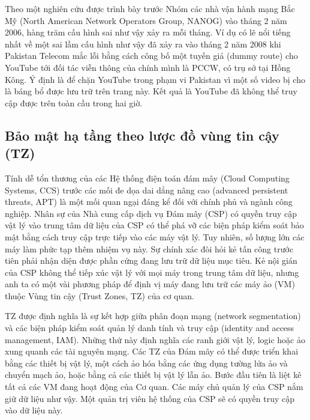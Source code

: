 Theo một nghiên cứu được trình bày trước Nhóm các nhà vận hành mạng Bắc Mỹ (North American Network Operators Group, NANOG) vào tháng 2 năm 2006, hàng trăm cấu hình sai như vậy xảy ra mỗi tháng. Ví dụ có lẽ nổi tiếng nhất về một sai lầm cấu hình như vậy đã xảy ra vào tháng 2 năm 2008 khi Pakistan Telecom mắc lỗi bằng cách công bố một tuyến giả (dummy route) cho YouTube tới đối tác viễn thông của chính mình là PCCW, có trụ sở tại Hồng Kông. Ý định là để chặn YouTube trong phạm vi Pakistan vì một số video bị cho là báng bổ được lưu trữ trên trang này. Kết quả là YouTube đã không thể truy cập được trên toàn cầu trong hai giờ.

\subsection{Bảo mật hạ tầng theo lược đồ vùng tin cậy (TZ)}

Tính dễ tổn thương của các Hệ thống điện toán đám mây (Cloud Computing Systems, CCS) trước các mối đe dọa dai dẳng nâng cao (advanced persistent threats, APT) là một mối quan ngại đáng kể đối với chính phủ và ngành công nghiệp. Nhân sự của Nhà cung cấp dịch vụ Đám mây (CSP) có quyền truy cập vật lý vào trung tâm dữ liệu của CSP có thể phá vỡ các biện pháp kiểm soát bảo mật bằng cách truy cập trực tiếp vào các máy vật lý. Tuy nhiên, số lượng lớn các máy làm phức tạp thêm nhiệm vụ này. Sự chính xác đòi hỏi kẻ tấn công trước tiên phải nhận diện được phần cứng đang lưu trữ dữ liệu mục tiêu. Kẻ nội gián của CSP không thể tiếp xúc vật lý với mọi máy trong trung tâm dữ liệu, nhưng anh ta có một vài phương pháp để định vị máy đang lưu trữ các máy ảo (VM) thuộc Vùng tin cậy (Trust Zones, TZ) của cơ quan.

TZ được định nghĩa là sự kết hợp giữa phân đoạn mạng (network segmentation) và các biện pháp kiểm soát quản lý danh tính và truy cập (identity and access management, IAM). Những thứ này định nghĩa các ranh giới vật lý, logic hoặc ảo xung quanh các tài nguyên mạng. Các TZ của Đám mây có thể được triển khai bằng các thiết bị vật lý, một cách ảo hóa bằng các ứng dụng tường lửa ảo và chuyển mạch ảo, hoặc bằng cả các thiết bị vật lý lẫn ảo. Bước đầu tiên là liệt kê tất cả các VM đang hoạt động của Cơ quan. Các máy chủ quản lý của CSP nắm giữ dữ liệu như vậy. Một quản trị viên hệ thống của CSP sẽ có quyền truy cập vào dữ liệu này.

